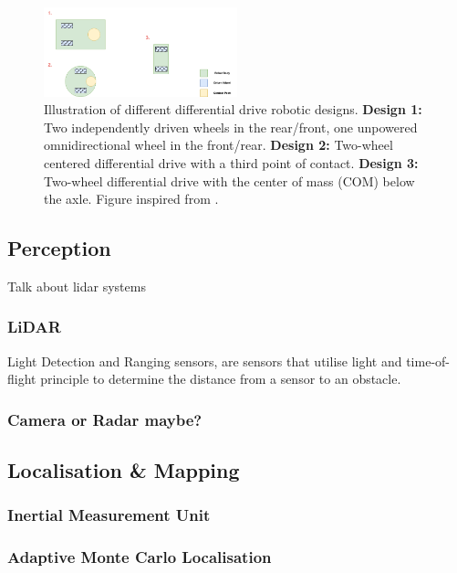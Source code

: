 \begin{figure}[H]
  \centering
  \includegraphics[width = 0.5\textwidth]{Figures/DifferentialDrive.drawio.png}
  \caption{Illustration of different differential drive robotic designs. \textbf{Design 1:} Two independently driven wheels in the rear/front, one unpowered omnidirectional wheel in the front/rear. \textbf{Design 2:} Two-wheel centered differential drive with a third point of contact. \textbf{Design 3:} Two-wheel differential drive with the center of mass (COM) below the axle. Figure inspired from \cite{SiegwartRoland2011Itam}.}
  \label{fig:differentialDrive}
\end{figure}



\subsection{Perception}
Talk about lidar systems
\subsubsection{LiDAR}
Light Detection and Ranging sensors, are sensors that utilise light and time-of-flight principle to determine the distance from a sensor to an obstacle. 

\subsubsection{Camera or Radar maybe?}


\subsection{Localisation \& Mapping}


\subsubsection{Inertial Measurement Unit}


\subsubsection{Adaptive Monte Carlo Localisation}



